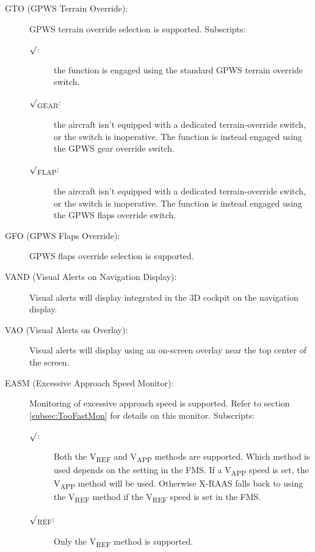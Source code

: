 \documentclass[a4paper,12pt]{article}
\begin{document}
\begin{description}

\item[GTO (GPWS Terrain Override):] GPWS terrain override selection is
supported. Subscripts:

\begin{description}

\item[$\surd$:] the function is engaged using the standard GPWS terrain
override switch.

\item[$\surd$\textsubscript{GEAR}:] the aircraft isn't equipped with a
dedicated terrain-override switch, or the switch is inoperative. The
function is instead engaged using the GPWS gear override switch.

\item[$\surd$\textsubscript{FLAP}:] the aircraft isn't equipped with a
dedicated terrain-override switch, or the switch is inoperative. The
function is instead engaged using the GPWS flaps override switch.

\end{description}

\item[GFO (GPWS Flaps Override):] GPWS flaps override selection is
supported.

\item[VAND (Visual Alerts on Navigation Display):] Visual alerts will
display integrated in the 3D cockpit on the navigation display.

\item[VAO (Visual Alerts on Overlay):] Visual alerts will display using
an on-screen overlay near the top center of the screen.

\item[EASM (Excessive Approach Speed Monitor):] Monitoring of excessive
approach speed is supported. Refer to section \ref{subsec:TooFastMon} for
details on this monitor. Subscripts:

\begin{description}

\item[$\surd$:] Both the V\textsubscript{REF} and V\textsubscript{APP}
methods are supported. Which method is used depends on the setting in the
FMS. If a V\textsubscript{APP} speed is set, the V\textsubscript{APP}
method will be used. Otherwise X-RAAS falls back to using the
V\textsubscript{REF} method if the V\textsubscript{REF} speed is set in
the FMS.

\item[$\surd$\textsubscript{REF}:] Only the V\textsubscript{REF} method
is supported.

\end{description}

\end{description}
\end{document}
